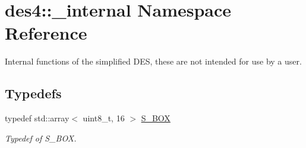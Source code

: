 \hypertarget{namespacedes4_1_1__internal}{}\section{des4\+:\+:\+\_\+internal Namespace Reference}
\label{namespacedes4_1_1__internal}


Internal functions of the simplified D\+ES, these are not intended for use by a user.  


\subsection*{Typedefs}
\begin{DoxyCompactItemize}
\item 
typedef std\+::array$<$ uint8\+\_\+t, 16 $>$ \hyperlink{namespacedes4_1_1__internal_a0ff9304b5240c9eb3e132d1f843b1c63}{S\+\_\+\+B\+OX}\hypertarget{namespacedes4_1_1__internal_a0ff9304b5240c9eb3e132d1f843b1c63}{}\label{namespacedes4_1_1__internal_a0ff9304b5240c9eb3e132d1f843b1c63}

\begin{DoxyCompactList}\small\item\em Typedef of S\+\_\+\+B\+OX. \end{DoxyCompactList}\end{DoxyCompactItemize}
